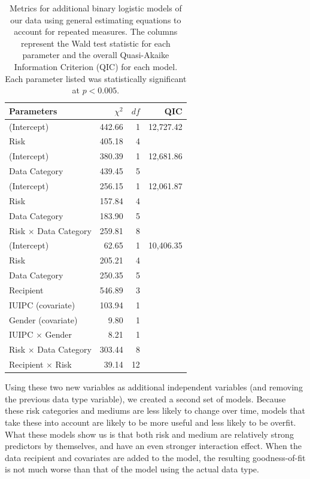 \documentclass{sig-alternate-hotpets15}
\begin{document}
\begin{table}[t]
\centering
\begin{tabular}{|l| r| r| r|}
\hline
Parameters & $\chi^2$ & $df$ & QIC\\
\hline
\hline
(Intercept) & 442.66 & 1 & 12,727.42\\
Risk & 405.18 & 4 & \\
\hline
(Intercept) & 380.39 & 1 & 12,681.86\\
Data Category & 439.45 & 5 & \\
\hline
(Intercept) & 256.15 & 1 & 12,061.87\\
Risk & 157.84 & 4 & \\
Data Category & 183.90 & 5 & \\
Risk $\times$ Data Category & 259.81 & 8 & \\
\hline
(Intercept) & 62.65 & 1 & 10,406.35\\
Risk & 205.21 & 4 & \\
Data Category & 250.35 & 5 & \\
Recipient & 546.89 & 3 & \\
IUIPC (covariate) & 103.94 & 1 & \\
Gender (covariate) & 9.80 & 1 & \\
IUIPC $\times$ Gender & 8.21 & 1 & \\
Risk $\times$ Data Category & 303.44 & 8 & \\
Recipient $\times$ Risk & 39.14 & 12 & \\
\hline
\end{tabular}
\caption{Metrics for additional binary logistic models of our data using general estimating equations to account for repeated measures. The columns represent the Wald test statistic for each parameter and the overall Quasi-Akaike Information Criterion (QIC) for each model. Each parameter listed was statistically significant at $p<0.005$.}
\label{regression2}
\end{table}

Using these two new variables as additional independent variables (and removing the previous data type variable), we created a second set of models. Because these risk categories and mediums are less likely to change over time, models that take these into account are likely to be more useful and less likely to be overfit. What these models show us is that both risk and medium are relatively strong predictors by themselves, and have an even stronger interaction effect. When the data recipient and covariates are added to the model, the resulting goodness-of-fit is not much worse than that of the model using the actual data type. 
\end{document}
